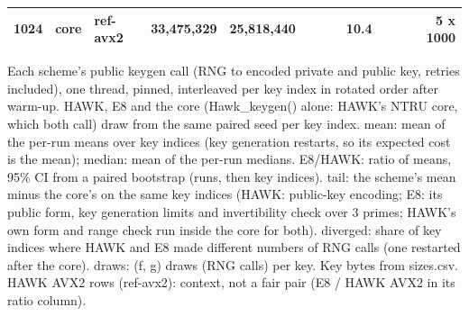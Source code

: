 \begin{table}[t]
{\begin{tabular}{rllrrlrrrrrr}
1024 & core & ref-avx2 & 33{,}475{,}329 & 25{,}818{,}440 &  &  &  & 10.4 &  &  & 5 x 1000 \\
\bottomrule
\end{tabular}}
\par\smallskip\parbox{\linewidth}{\scriptsize Each scheme's public keygen call (RNG to encoded private and public key, retries included), one thread, pinned, interleaved per key index in rotated order after warm-up. HAWK, E8 and the core (Hawk\_keygen() alone: HAWK's NTRU core, which both call) draw from the same paired seed per key index. mean: mean of the per-run means over key indices (key generation restarts, so its expected cost is the mean); median: mean of the per-run medians. E8/HAWK: ratio of means, 95\% CI from a paired bootstrap (runs, then key indices). tail: the scheme's mean minus the core's on the same key indices (HAWK: public-key encoding; E8: its public form, key generation limits and invertibility check over 3 primes; HAWK's own form and range check run inside the core for both). diverged: share of key indices where HAWK and E8 made different numbers of RNG calls (one restarted after the core). draws: (f, g) draws (RNG calls) per key. Key bytes from sizes.csv. HAWK AVX2 rows (ref-avx2): context, not a fair pair (E8 / HAWK AVX2 in its ratio column).}
\end{table}

